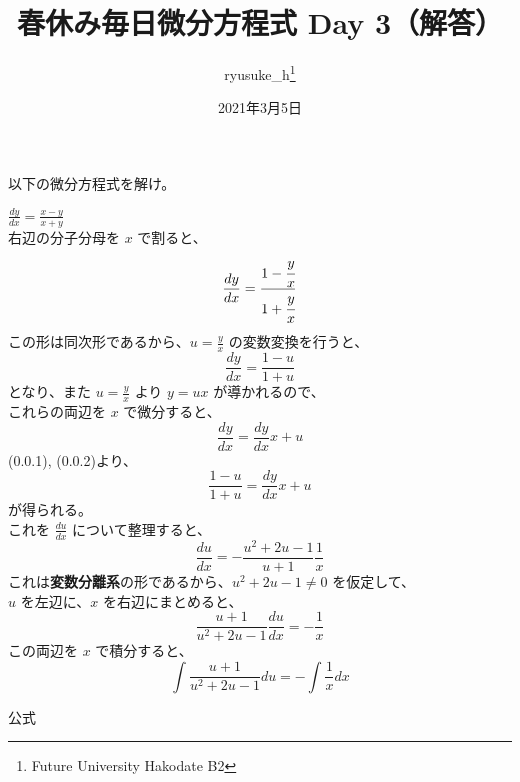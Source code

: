 \documentclass[a4j]{jsarticle}
\title{春休み毎日微分方程式 Day 3（解答）}
\author{ryusuke\_h\thanks{Future University Hakodate B2}}
\date{2021年3月5日}
\begin{document}
\begin{spacing}{1.6}
\maketitle

以下の微分方程式を解け。
\begin{qparts}
    \qpart $ \displaystyle \frac{dy}{dx} = \frac{x - y}{x + y} $ \\

    右辺の分子分母を $ x $ で割ると、\\
    \begin{equation}
      \frac{dy}{dx} = \frac{1 - \cfrac{y}{x}}{1 + \cfrac{y}{x}} \nonumber
    \end{equation}
    この形は同次形であるから、$ \displaystyle u = \frac{y}{x} $ の変数変換を行うと、
    \begin{equation}
      \frac{dy}{dx} = \frac{1 - u}{1 + u}
    \end{equation}
    となり、また $ \displaystyle u = \frac{y}{x} $ より $ y = ux $ が導かれるので、\\
    これらの両辺を $ x $ で微分すると、\\
    \begin{equation}
      \frac{dy}{dx} = \frac{dy}{dx}x + u
    \end{equation}
    (0.0.1), (0.0.2)より、
    \begin{equation}
      \frac{1 - u}{1 + u} = \frac{dy}{dx}x + u \nonumber
    \end{equation}
    が得られる。\\
    これを $ \displaystyle \frac{du}{dx} $ について整理すると、\\
    \begin{equation}
      \frac{du}{dx} = - \frac{u ^ 2 + 2u - 1}{u + 1}\frac{1}{x} \nonumber
    \end{equation}
    これは{\bf 変数分離系}の形であるから、$ u ^ 2 + 2u - 1 \neq 0 $ を仮定して、\\
    $ u $ を左辺に、$ x $ を右辺にまとめると、
    \begin{equation}
      \frac{u + 1}{u ^ 2 + 2u - 1} \frac{du}{dx} = -\frac{1}{x} \nonumber
    \end{equation}
    この両辺を $ x $ で積分すると、
    \begin{equation}
      \int \frac{u + 1}{u ^ 2 + 2u - 1} du = - \int \frac{1}{x}dx
    \end{equation}
    \begin{itembox}{公式}

\end{itembox}
\end{qparts}
\end{spacing}
\end{document}
